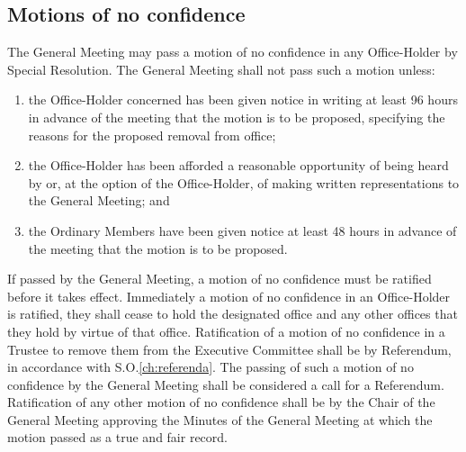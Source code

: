 \subsection{Motions of no confidence}
\npara The General Meeting may pass a motion of no confidence in any Office-Holder by Special Resolution.  The General Meeting shall not pass such a motion unless:
\begin{enumerate}
	\item the Office-Holder concerned has been given notice in writing at least 96 hours in advance of the meeting that the motion is to be proposed, specifying the reasons for the proposed removal from office;
	\item the Office-Holder has been afforded a reasonable opportunity of being heard by or, at the option of the Office-Holder, of making written representations to the General Meeting; and
	\item the Ordinary Members have been given notice at least 48 hours in advance of the meeting that the motion is to be proposed.
\end{enumerate}
\npara If passed by the General Meeting, a motion of no confidence must be ratified before it takes effect.  Immediately a motion of no confidence in an Office-Holder is ratified, they shall cease to hold the designated office and any other offices that they hold by virtue of that office.
\npara Ratification of a motion of no confidence in a Trustee to remove them from the Executive Committee shall be by Referendum, in accordance with S.O.\ref{ch:referenda}.  The passing of such a motion of no confidence by the General Meeting shall be considered a call for a Referendum.
\npara Ratification of any other motion of no confidence shall be by the Chair of the General Meeting approving the Minutes of the General Meeting at which the motion passed as a true and fair record.
